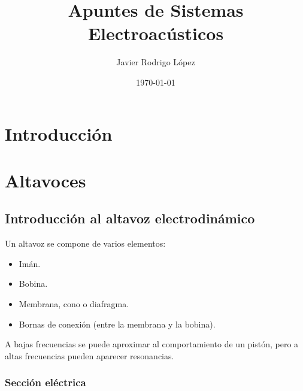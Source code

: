 \documentclass[12pt, a4paper]{article}
\title{Apuntes de Sistemas Electroacústicos}
\author{Javier Rodrigo López}
\date{\today}
\begin{document}
\maketitle

\tableofcontents

\newpage
\section*{Introducción}

\section{Altavoces}

\subsection{Introducción al altavoz electrodinámico}


Un altavoz se compone de varios elementos:

\begin{itemize}
    \item Imán.
    \item Bobina.
    \item Membrana, cono o diafragma.
    \item Bornas de conexión (entre la membrana y la bobina).
\end{itemize}

A bajas frecuencias se puede aproximar al comportamiento de un pistón, pero a altas frecuencias pueden aparecer resonancias. 

\subsubsection{Sección eléctrica}
\end{document}
